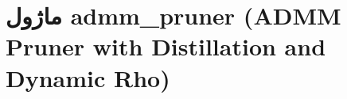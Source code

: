 \section{ماژول admm\_pruner (ADMM Pruner with Distillation and Dynamic Rho)}
\label{sec:module_admm_pruner}
